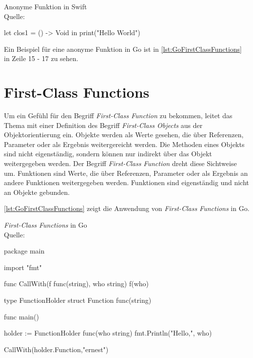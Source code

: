 \begin{listing}[H]
\caption{Anonyme Funktion in Swift \\ Quelle:\cite[S.220]{Hoffman.2017}}
\label{lst:SwiftClosure}
\begin{SwiftCode}
let clos1 = {
    () -> Void in
    print("Hello World")
}
\end{SwiftCode}
\end{listing}

Ein Beispiel für eine anonyme Funktion in Go ist in \autoref{lst:GoFirstClassFunctions} in Zeile 15 - 17 zu sehen.

\section{First-Class Functions}
Um ein Gefühl für den Begriff \textit{First-Class Function} zu bekommen, leitet \cite[S.243f]{Esser.2011} das Thema mit einer Definition des Begriff \textit{First-Class Objects} aus der Objektorientierung ein.
Objekte werden als Werte gesehen, die über Referenzen, Parameter oder als Ergebnis weitergereicht werden.
Die Methoden eines Objekts sind nicht eigenständig, sondern können nur indirekt über das Objekt weitergegeben werden.
Der Begriff \textit{First-Class Function} dreht diese Sichtweise um.
Funktionen sind Werte, die über Referenzen, Parameter oder als Ergebnis an andere Funktionen weitergegeben werden.
Funktionen sind eigenständig und nicht an Objekte gebunden. 

\autoref{lst:GoFirstClassFunctions} zeigt die Anwendung von \textit{First-Class Functions} in Go.

\begin{listing}[H]
\caption{\textit{First-Class Functions} in Go \\ Quelle:\cite[]{Go.FirstClassFunctions}}
\label{lst:GoFirstClassFunctions}
\begin{GoCode}
package main

import "fmt"

func CallWith(f func(string), who string) {
    f(who)
}

type FunctionHolder struct {
    Function func(string)
}

func main() {
    holder :=   FunctionHolder{ 
                    func(who string) {
                        fmt.Println("Hello,", who) 
                    }
                }
                
    CallWith(holder.Function,"ernest")
}
\end{GoCode}
\end{listing}

